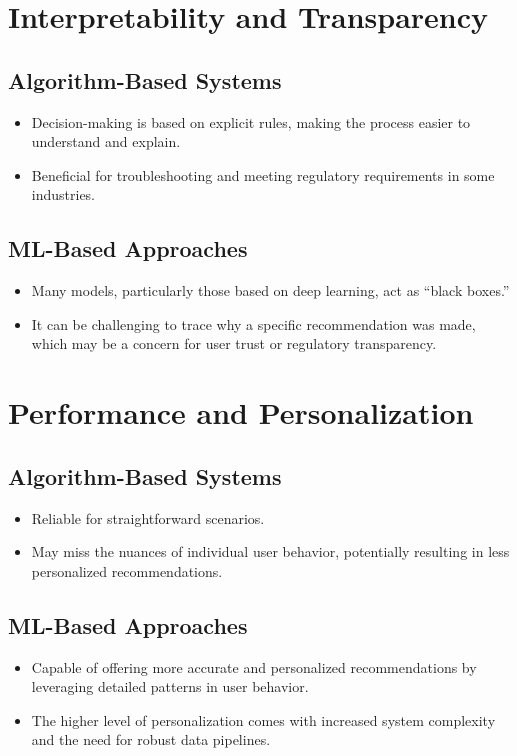 \documentclass{article}
\begin{document}
\section{Interpretability and Transparency}
\subsection{Algorithm-Based Systems}
\begin{itemize}
    \item Decision-making is based on explicit rules, making the process easier to understand and explain.
    \item Beneficial for troubleshooting and meeting regulatory requirements in some industries.
\end{itemize}

\subsection{ML-Based Approaches}
\begin{itemize}
    \item Many models, particularly those based on deep learning, act as “black boxes.”
    \item It can be challenging to trace why a specific recommendation was made, which may be a concern for user trust or regulatory transparency.
\end{itemize}

\section{Performance and Personalization}
\subsection{Algorithm-Based Systems}
\begin{itemize}
    \item Reliable for straightforward scenarios.
    \item May miss the nuances of individual user behavior, potentially resulting in less personalized recommendations.
\end{itemize}

\subsection{ML-Based Approaches}
\begin{itemize}
    \item Capable of offering more accurate and personalized recommendations by leveraging detailed patterns in user behavior.
    \item The higher level of personalization comes with increased system complexity and the need for robust data pipelines.
\end{itemize}
\end{document}
